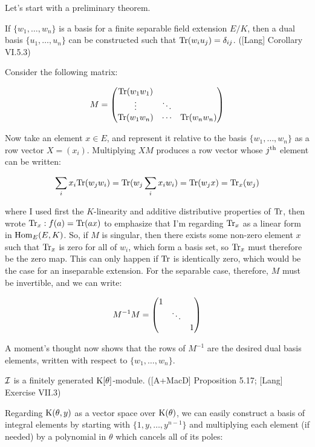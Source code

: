 Let's start with a preliminary theorem.

\theorem
\label{construction of dual basis}

If $\{w_1,\ldots,w_n\}$ is a basis for a finite separable field
extension $E/K$, then a dual basis $\{u_1,\ldots,u_n\}$ can be
constructed such that ${\rm Tr}(w_i u_j) = \delta_{ij}$.
([Lang] Corollary VI.5.3)

\proof

Consider the following matrix:

$$M = \begin{pmatrix}{\rm Tr}(w_1 w_1) & & \cr \vdots & \ddots & \cr {\rm Tr}(w_1 w_n) & \cdots & {\rm Tr}(w_n w_n)\end{pmatrix}$$

Now take an element $x \in E$, and represent it relative to the basis
$\{w_1,\ldots,w_n\}$ as a row vector $X = (x_i)$.  Multiplying $X M$
produces a row vector whose $j^{\rm th}$ element can be written:

$$\sum_i x_i {\rm Tr}(w_j w_i) = {\rm Tr}(w_j \sum_i x_i w_i) = {\rm Tr}(w_j x) = {\rm Tr}_x(w_j)$$

where I used first the $K$-linearity and additive distributive
properties of ${\rm Tr}$, then wrote ${\rm Tr}_x: f(a) = {\rm Tr}(ax)$
to emphasize that I'm regarding ${\rm Tr}_x$ as a linear form in ${\rm
Hom}_E(E,K)$.  So, if $M$ is singular, then there exists some non-zero
element $x$ such that ${\rm Tr}_x$ is zero for all of $w_i$, which
form a basis set, so ${\rm Tr}_x$ must therefore be the zero map.
This can only happen if ${\rm Tr}$ is identically zero, which would be
the case for an inseparable extension.  For the separable case,
therefore, $M$ must be invertible, and we can write:

$$M^{-1} M = \begin{pmatrix}1 & & \cr & \ddots & \cr & & 1\end{pmatrix}$$

A moment's thought now shows that the rows of $M^{-1}$ are the desired
dual basis elements, written with respect to $\{w_1,\ldots,w_n\}$.

\endtheorem


\theorem
\label{I is finitely generated}

${\cal I}$ is a finitely generated ${\rm K}[\theta]$-module.
([A+MacD] Proposition 5.17; [Lang] Exercise VII.3)

\proof

Regarding ${\rm K}(\theta,y)$ as a vector space over ${\rm
K}(\theta)$, we can easily construct a basis of integral elements by
starting with $\{1, y, \ldots, y^{n-1}\}$ and multiplying each element
(if needed) by a polynomial in $\theta$ which cancels all of its poles:

